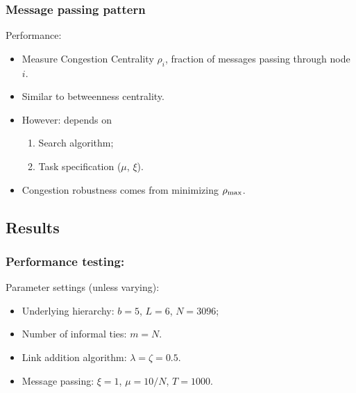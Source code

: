 \begin{frame}
  \frametitle{Message passing pattern}

  \begin{block}{Performance:}
  \begin{itemize}
  \item<1->
    Measure Congestion Centrality $\rho_i$,
    fraction of messages passing through node $i$.
  \item<2->
    Similar to betweenness centrality.
  \item<3->  
    However: depends on 
    \begin{enumerate}
    \item<3->
      Search algorithm;
    \item<4->
      Task specification ($\mu$, $\xi$).
    \end{enumerate}
  \item<5->  
    Congestion robustness comes from
    minimizing $\rho_{\textnormal{max}}$.
  \end{itemize}
  \end{block}

\end{frame}



\subsection{Results}


\begin{frame}
  \frametitle{Performance testing:}

  \begin{block}{Parameter settings (unless varying):}
    \begin{itemize}
    \item<1->
      Underlying hierarchy:
      $b=5$, $L=6$, $N=3096$;
    \item<2->
      Number of informal ties:
      $m=N$.
    \item<3->
      Link addition algorithm:
      $\lambda=\zeta=0.5$.
    \item<4->
      Message passing:
      $\xi=1$, $\mu=10/N$, $T=1000$.
    \end{itemize}
  \end{block}

\end{frame}

